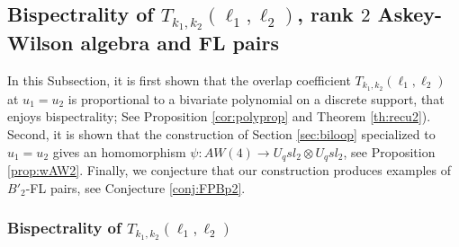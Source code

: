 \documentclass[11pt]{amsart}
\numberwithin{equation}{section}
\numberwithin{equation}{section}
\begin{document}
\subsection{Bispectrality of $T_{k_1,k_2}(\ell_1,\ell_2)$, rank $2$ Askey-Wilson algebra and FL pairs}\label{ssec:T}
In this Subsection,
it is first shown that the overlap coefficient $T_{k_1,k_2}(\ell_1,\ell_2)$ at $u_1=u_2$ is proportional to a  bivariate polynomial on a discrete support, that enjoys bispectrality; See Proposition \ref{cor:polyprop} and  Theorem \ref{th:recu2}). Second, it is shown that the construction of Section \ref{sec:biloop} specialized to $u_1=u_2$ gives an homomorphism $\psi: AW(4)\rightarrow U_qsl_2 \otimes U_qsl_2$, see Proposition \ref{prop:wAW2}.  
Finally, we conjecture that our construction produces examples of $B'_2$-FL pairs, see Conjecture \ref{conj:FPBp2}.

\subsubsection{Bispectrality of $T_{k_1,k_2}(\ell_1,\ell_2)$}
\end{document}
